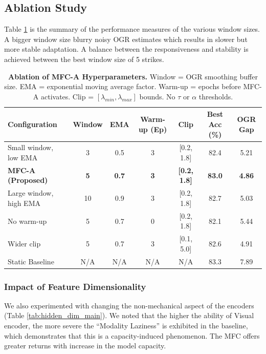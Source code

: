 \documentclass[fleqn,10pt]{wlscirep}
\begin{document}
\subsection{Ablation Study}
Table \ref{tab:ablation} is the summary of the performance measures of the various window sizes. A bigger window size blurry noisy OGR estimates which results in slower but more stable adaptation. A balance between the responsiveness and stability is achieved between the best window size of 5 strikes.

\begin{table}[t]
\caption{\textbf{Ablation of MFC-A Hyperparameters.} Window = OGR smoothing buffer size. EMA = exponential moving average factor. Warm-up = epochs before MFC-A activates. Clip = $[\lambda_{min}, \lambda_{max}]$ bounds. No $\tau$ or $\alpha$ thresholds.}
\label{tab:ablation}
\centering
\begin{tabular}{@{}lcccccc@{}}
\toprule
\textbf{Configuration} & \textbf{Window} & \textbf{EMA} & \textbf{Warm-up (Ep)} & \textbf{Clip} & \textbf{Best Acc (\%)} & \textbf{OGR Gap} \\ \midrule
Small window, low EMA  & 3  & 0.5 & 3 & [0.2, 1.8] & 82.4 & 5.21 \\
\textbf{MFC-A (Proposed)} & \textbf{5} & \textbf{0.7} & \textbf{3} & \textbf{[0.2, 1.8]} & \textbf{83.0} & \textbf{4.86} \\
Large window, high EMA & 10 & 0.9 & 3 & [0.2, 1.8] & 82.7 & 5.03 \\
No warm-up             & 5  & 0.7 & 0 & [0.2, 1.8] & 82.1 & 5.44 \\
Wider clip             & 5  & 0.7 & 3 & [0.1, 5.0] & 82.6 & 4.91 \\
Static Baseline        & N/A & N/A & N/A & N/A       & 83.3 & 7.89 \\
\bottomrule
\end{tabular}
\end{table}

\subsubsection*{Impact of Feature Dimensionality}
We also experimented with changing the non-mechanical aspect of the encoders (Table \ref{tab:hidden_dim_main}). We noted that the higher the ability of Visual encoder, the more severe the ``Modality Laziness'' is exhibited in the baseline, which demonstrates that this is a capacity-induced phenomenon. The MFC offers greater returns with increase in the model capacity.
\end{document}

